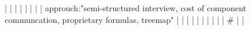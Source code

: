 |    |            |      |                                                                      |                                                                                                                                                                          |                                                                                                                                                                                                                                                            |                                                                                                                                                                                                                                                                      |  approuch:"semi-structured interview, cost of component communcation, proprietary formulas, treemap"                                                                                                                                                                                                     |                                                                                                                                                                                                                                                                                                                                                                                                                                                                                              |
|    |            |      |                                                                      |                                                                                                                                                                          |                                                                                                                                                                                                                                                            |                                                                                                                                                                                                                                                                      |  #                                                                                                                                                                                                                                                                                                       |                                                                                                                                                                                                                                                                                                                                                                                                                                                                                              |
